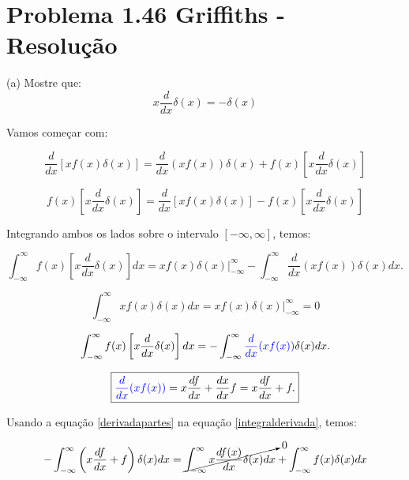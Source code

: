 \documentclass[a4paper,12pt]{article}
\begin{document}
\section*{Problema 1.46 Griffiths - Resolu\c{c}\~ao}


(a) Mostre que:
\begin{equation}
\boxed{ x \frac{d}{d x} \delta(x)=-\delta(x)}
\end{equation}

Vamos come\c{c}ar com:

\begin{equation}
\frac{d}{dx}\left[ xf(x)\delta(x)\right] = \frac{d}{dx}\left( xf(x) \right)\delta(x) + f(x)\left[ x\frac{d}{dx}\delta(x)\right]
\end{equation}

\begin{equation}
    f(x)\left[ x\frac{d}{dx}\delta(x)\right] = \frac{d}{dx}\left[ xf(x)\delta(x)\right] - f(x)\left[ x\frac{d}{dx}\delta(x)\right]
\end{equation}

Integrando ambos os lados sobre o intervalo $[-\infty,\infty]$, temos:


\begin{equation}
    \int_{-\infty}^{\infty} f(x)\left[x \frac{d}{d x} \delta(x)\right] d x = \left.x f(x) \delta(x)\right|_{-\infty} ^{\infty}-\int_{-\infty}^{\infty} \frac{d}{d x}(x f(x)) \delta(x) d x.    
\end{equation}

\begin{equation}
    \int_{-\infty}^{\infty} x f(x) \delta(x) d x = \left.x f(x) \delta(x)\right|_{-\infty} ^{\infty} = 0
\end{equation}

\begin{equation}\label{integralderivada}
    \int_{-\infty}^{\infty} f(x)\left[x \frac{d}{d x} \delta(x)\right] d x= -\int_{-\infty}^{\infty} \textcolor{blue}{\frac{d}{d x}(x f(x))} \delta(x) d x.    
\end{equation}

\begin{equation}\label{derivadapartes}
    \boxed{
        \textcolor{blue}{\frac{d}{d x}(x f(x))} =x \frac{d f}{d x}+\frac{d x}{d x} f=x \frac{d f}{d x}+f.
    }
\end{equation}

Usando a equação \ref{derivadapartes} na equação \ref{integralderivada}, temos:

\begin{equation}
    -\int_{-\infty}^{\infty}\left(x \frac{d f}{d x}+f\right) \delta(x) d x = \cancelto{0}{\int_{-\infty}^{\infty} x \frac{d f(x)}{d x} \delta(x) d x} + \int_{-\infty}^{\infty} f(x) \delta(x) d x
\end{equation}
\end{document}
